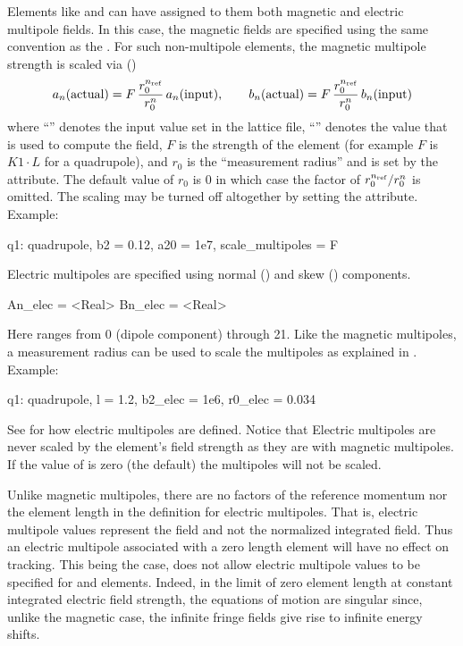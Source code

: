 Elements like  and  can have assigned to them both magnetic and
electric multipole fields. In this case, the magnetic fields are specified using the same convention
as the .  For such non-multipole elements, the magnetic multipole strength is
scaled via () 
\begin{equation}
a_n(\text{actual}) = F \, \frac{r_0^{n_{\text{ref}}}}{r_0^n} \, a_n(\text{input}), \qquad
b_n(\text{actual}) = F \, \frac{r_0^{n_{\text{ref}}}}{r_0^n} \, b_n(\text{input})
\end{equation}
where ``'' denotes the input value set in the lattice file, ``'' denotes the
value that is used to compute the field, $F$ is the strength of the element (for example $F$ is $K1 \cdot
L$ for a quadrupole), and $r_0$ is the ``measurement radius'' and is set by the 
attribute. The default value of $r_0$ is 0 in which case the factor of $r_0^{n_{\text{ref}}}/r_0^n$ is
omitted. The scaling may be turned off altogether by setting the  attribute.
Example:
\begin{example}
  q1: quadrupole, b2 = 0.12, a20 = 1e7, scale_multipoles = F
\end{example}

Electric multipoles are specified using normal () and skew
() components. \begin{example}
  An_elec = <Real>
  Bn_elec = <Real>
\end{example}
Here  ranges from 0 (dipole component) through 21. Like the magnetic multipoles, a measurement
radius  can be used to scale the multipoles as explained in .
Example:
\begin{example}
  q1: quadrupole, l = 1.2, b2_elec = 1e6, r0_elec = 0.034
\end{example}
See  for how electric multipoles are defined. Notice that Electric multipoles are
never scaled by the element's field strength as they are with magnetic multipoles. If the value of
 is zero (the default) the multipoles will not be scaled.

Unlike magnetic multipoles, there are no factors of the reference momentum nor the element length in
the definition for electric multipoles. That is, electric multipole values represent the field and
not the normalized integrated field. Thus an electric multipole associated with a zero length
element will have no effect on tracking. This being the case, \bmad does not allow electric
multipole values to be specified for  and  elements. Indeed, in the
limit of zero element length at constant integrated electric field strength, the equations of motion
are singular since, unlike the magnetic case, the infinite fringe fields give rise to infinite
energy shifts.

